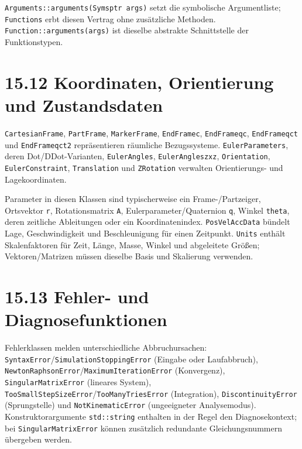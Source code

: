 \documentclass[
  12pt
]{book}
\begin{document}
\texttt{Arguments::arguments(Symsptr\ args)} setzt die symbolische
Argumentliste; \texttt{Functions} erbt diesen Vertrag ohne zusätzliche
Methoden. \texttt{Function::arguments(args)} ist dieselbe abstrakte
Schnittstelle der Funktionstypen.

\hypertarget{koordinaten-orientierung-und-zustandsdaten}{%
\section{\texorpdfstring{{15.12} Koordinaten, Orientierung und
Zustandsdaten}{15.12 Koordinaten, Orientierung und Zustandsdaten}}\label{koordinaten-orientierung-und-zustandsdaten}}

\texttt{CartesianFrame}, \texttt{PartFrame}, \texttt{MarkerFrame},
\texttt{EndFramec}, \texttt{EndFrameqc}, \texttt{EndFrameqct} und
\texttt{EndFrameqct2} repräsentieren räumliche Bezugssysteme.
\texttt{EulerParameters}, deren Dot/DDot-Varianten,
\texttt{EulerAngles}, \texttt{EulerAngleszxz}, \texttt{Orientation},
\texttt{EulerConstraint}, \texttt{Translation} und \texttt{ZRotation}
verwalten Orientierungs- und Lagekoordinaten.

Parameter in diesen Klassen sind typischerweise ein Frame-/Partzeiger,
Ortsvektor \texttt{r}, Rotationsmatrix \texttt{A},
Eulerparameter/Quaternion \texttt{q}, Winkel \texttt{theta}, deren
zeitliche Ableitungen oder ein Koordinatenindex. \texttt{PosVelAccData}
bündelt Lage, Geschwindigkeit und Beschleunigung für einen Zeitpunkt.
\texttt{Units} enthält Skalenfaktoren für Zeit, Länge, Masse, Winkel und
abgeleitete Größen; Vektoren/Matrizen müssen dieselbe Basis und
Skalierung verwenden.

\hypertarget{fehler--und-diagnosefunktionen}{%
\section{\texorpdfstring{{15.13} Fehler- und
Diagnosefunktionen}{15.13 Fehler- und Diagnosefunktionen}}\label{fehler--und-diagnosefunktionen}}

Fehlerklassen melden unterschiedliche Abbruchursachen:
\texttt{SyntaxError}/\texttt{SimulationStoppingError} (Eingabe oder
Laufabbruch), \texttt{NewtonRaphsonError}/\texttt{MaximumIterationError}
(Konvergenz), \texttt{SingularMatrixError} (lineares System),
\texttt{TooSmallStepSizeError}/\texttt{TooManyTriesError} (Integration),
\texttt{DiscontinuityError} (Sprungstelle) und
\texttt{NotKinematicError} (ungeeigneter Analysemodus).
Konstruktorargumente \texttt{std::string} enthalten in der Regel den
Diagnosekontext; bei \texttt{SingularMatrixError} können zusätzlich
redundante Gleichungsnummern übergeben werden.
\end{document}
